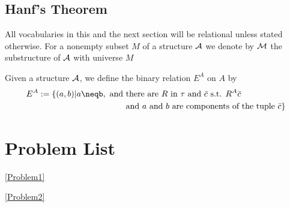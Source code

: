 \documentclass[11pt]{article}
\begin{document}
\subsection{Hanf's Theorem}
\label{sec:org15f9460}
All vocabularies in this and the next section will be relational unless stated otherwise. For a
nonempty subset \(M\) of a structure \(\mathcal{A}\) we denote by \(\mathcal{M}\) the substructure
of \(\mathcal{A}\) with universe \(M\)

Given a structure \(\mathcal{A}\), we define the binary relation \(E^A\) on \(A\) by
   \begin{align*}
E^A:=\{(a,b)|a\neqb,\text{ and }&\text{there are $R$ in $\tau$ and $\barc$ s.t. }R^A\barc\\
&\text{and $a$ and $b$ are components of the tuple }\barc\}
   \end{align*}
\section{Problem List}
\label{sec:org28ebcb9}
\ref{Problem1}

\ref{Problem2}
\end{document}
